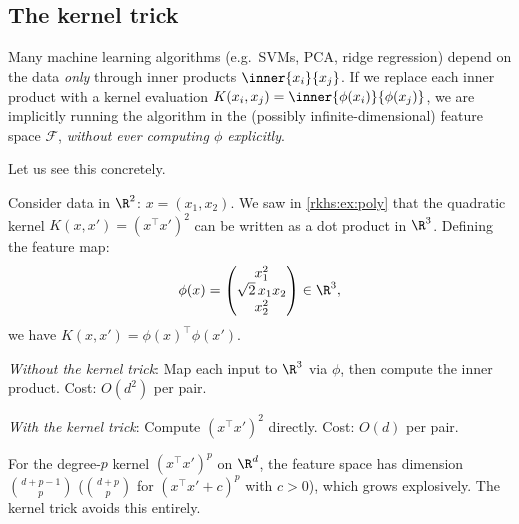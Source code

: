 \begin{notechapter}
\subsection{The kernel trick}
\label{rkhs:subsec:kernel_trick}

\begin{keyidea}
Many machine learning algorithms (e.g.\ SVMs, PCA, ridge regression)
depend on the data \emph{only} through inner products
$\inner{x_i}{x_j}$. If we replace each inner product with a kernel
evaluation $K(x_i, x_j) = \inner{\phi(x_i)}{\phi(x_j)}$, we are
implicitly running the algorithm in the (possibly infinite-dimensional)
feature space $\mathcal{F}$, \emph{without ever computing $\phi$
explicitly}.
\end{keyidea}

Let us see this concretely.

\begin{example}\label{rkhs:ex:kernel-trick}
Consider data in $\R^2$: $x = (x_1, x_2)$. We saw in
\cref{rkhs:ex:poly} that the quadratic kernel
$K(x,x') = (x^\top x')^2$ can be written as a dot
product in $\R^3$. Defining the feature map:
\[
\phi(x) = \begin{pmatrix} x_1^2 \\
\sqrt{2}\,x_1 x_2 \\ x_2^2
\end{pmatrix} \in \R^3,
\]
we have
$K(x,x') = \phi(x)^\top \phi(x')$.

\emph{Without the kernel trick}: Map each input to
$\R^3$ via $\phi$, then compute the inner product.
Cost: $O(d^2)$ per pair.

\emph{With the kernel trick}: Compute $(x^\top x')^2$
directly. Cost: $O(d)$ per pair.

For the degree-$p$ kernel $(x^\top x')^p$ on $\R^d$, the
feature space has dimension $\binom{d+p-1}{p}$
($\binom{d+p}{p}$ for $(x^\top x' + c)^p$ with $c > 0$), which
grows explosively. The kernel trick avoids this
entirely.
\end{example}

\begin{figure}[ht]
\centering
{}
\end{figure}
\end{notechapter}
